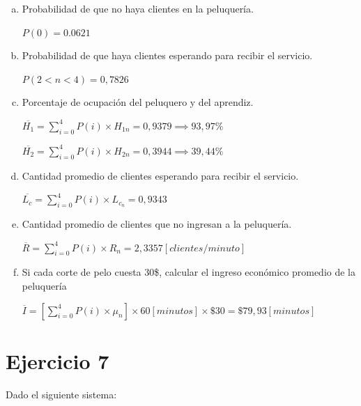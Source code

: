 \documentclass[a4paper,11pt]{article}
\begin{document}
\vspace{27pt}
\begin{enumerate}[a)]
  \item Probabilidad de que no haya clientes en la peluquería.

  $P(0) = 0.0621$

  \vspace{13pt}
  \item Probabilidad de que haya clientes esperando para recibir el servicio.

  $P(2<n<4) = 0,7826$

  \vspace{13pt}
  \item Porcentaje de ocupación del peluquero y del aprendiz.

  $\overline{H_1} = \displaystyle\sum_{i=0}^{4} P(i) \times H_{1n} = 0,9379 \implies 93,97\% $

  $\overline{H_2} = \displaystyle\sum_{i=0}^{4} P(i) \times H_{2n} = 0,3944 \implies 39,44\% $

  \vspace{13pt}
  \parindent=0pt
  \item Cantidad promedio de clientes esperando para recibir el servicio.

  $\overline{L_c} = \displaystyle\sum_{i=0}^{4} P(i) \times L_{c_n} = 0,9343$

  \vspace{13pt}
  \item Cantidad promedio de clientes que no ingresan a la peluquería.

  $\overline{R} = \displaystyle\sum_{i=0}^{4} P(i) \times R_n = 2,3357[clientes/minuto]$

  \vspace{13pt}
  \item Si cada corte de pelo cuesta 30\$, calcular el ingreso económico promedio
    de la peluquería

  $\overline{I} = \left[ \displaystyle\sum_{i=0}^{4} P(i) \times \mu_n \right] \times 60[minutos] \times \$30 = \$79,93[minutos]$

\end{enumerate}

\vspace{35pt}
\section{\textbf{Ejercicio 7}}

Dado el siguiente sistema:
\end{document}
